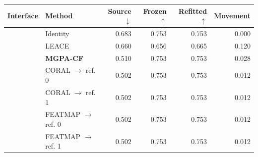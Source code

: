 \begingroup\small\setlength{\tabcolsep}{4pt}
\begin{tabular}{@{}llrrrr@{}}
\toprule
Interface & Method & Source $\downarrow$ & Frozen $\uparrow$ & Refitted $\uparrow$ & Movement \\
\midrule
{} & Identity & 0.683 & 0.753 & 0.753 & 0.000 \\
 & LEACE & 0.660 & 0.656 & 0.665 & 0.120 \\
 & \textbf{MGPA-CF} & 0.510 & 0.753 & 0.753 & 0.028 \\
\midrule
{} & CORAL $\to$ ref. 0 & 0.502 & 0.753 & 0.753 & 0.012 \\
 & CORAL $\to$ ref. 1 & 0.502 & 0.753 & 0.753 & 0.012 \\
 & FEATMAP $\to$ ref. 0 & 0.502 & 0.753 & 0.753 & 0.012 \\
 & FEATMAP $\to$ ref. 1 & 0.502 & 0.753 & 0.753 & 0.012 \\
\bottomrule
\end{tabular}\endgroup
